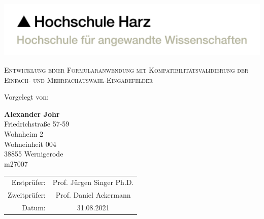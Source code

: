 \begin{titlepage}

    \includegraphics[width=0.5\paperwidth]{Sonstiges/Deckblatt/HSH-Logo-RGB-dt.pdf}

    \begin{center}



        \vfill


        \LARGE{\textsc{Entwicklung einer Formularanwendung mit Kompatibilitätsvalidierung der Einfach- und Mehrfachauswahl-Eingabefelder}}

        \vfill
        \vfill
        \vfill



        \normalsize
        Vorgelegt von:

        \vspace{3mm}

        \textbf{Alexander Johr}\\
        Friedrichstraße 57-59\\
        Wohnheim 2\\
        Wohneinheit 004\\
        38855 Wernigerode\\
        m27007

        \vspace{21mm}

        \begin{tabular}{r c}
            Erstprüfer:  & Prof. Jürgen Singer Ph.D. \\
            Zweitprüfer: & Prof. Daniel Ackermann    \\
            Datum:       & 31.08.2021                \\
        \end{tabular}

        \vspace{5mm}

    \end{center}

\end{titlepage}